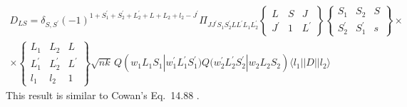 \documentclass[a4paper,oneside,12pt]{extarticle}
\begin{document}
\begin{multline}
D_{LS} = \delta_{S,S^{\prime}}
%
(-1)^{1+S_1^{\prime}+S_2^{\prime} +L_2^{\prime}+L +L_2+l_2 -J^{\prime}} \Pi_{JJ^{\prime} S_1 S_2^{\prime} L L^{\prime} L_1 L_2^{\prime}}
\left \{
\begin{array}{ccc}
L & S & J \\
J^{\prime} & 1 & L^{\prime}
\end{array}
\right \}
\left \{
\begin{array}{ccc}
S_1 & S_2 & S \\
S_2^{\prime} & S_1^{\prime} & s
\end{array}
\right \} \times \\ \times
%
\left \{
\begin{array}{ccc}
L_1 & L_2 & L \\
L_1^{\prime} & L_2^{\prime} & L^{\prime} \\
l_1 & l_2 & 1
\end{array}
\right \}
%
\sqrt{nk}\, Q(w_1 L_1 S_1 | w_1^{\prime} L_1^{\prime} S_1^{\prime})
Q(w_2^{\prime} L_2^{\prime} S_2^{\prime} | w_2 L_2 S_2)
\langle l_1 || D || l_2 \rangle
\end{multline}
%
This result is similar to Cowan's Eq.~14.88 \cite{Cowan}.
\end{document}
